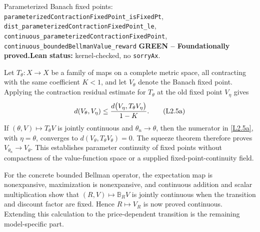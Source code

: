 \documentclass[11pt]{article}
\newcommand{\leanname}[1]{\nolinkurl{#1}}
\newcommand{\eqL}[1]{\refstepcounter{equation}\tag{L#1}}
\newcommand{\formalcheck}{\textbf{Lean status:} kernel-checked, no \texttt{sorryAx}.}
\newcommand{\greenstatus}{\textcolor{proved}{\textbf{GREEN -- Foundationally proved.}}}
\begin{document}
\begin{greenbox}{Parameterized Banach fixed points:
\leanname{parameterizedContractionFixedPoint_isFixedPt},
\leanname{dist_parameterizedContractionFixedPoint_le},
\leanname{continuous_parameterizedContractionFixedPoint},
\leanname{continuous_boundedBellmanValue_reward}}
\greenstatus\quad\formalcheck

Let $T_\theta:X\to X$ be a family of maps on a complete metric space, all
contracting with the same coefficient $K<1$, and let $V_\theta$ denote the
Banach fixed point.  Applying the contraction residual estimate for
$T_\theta$ at the old fixed point $V_\eta$ gives
\begin{equation}
 d(V_\theta,V_\eta)
 \le \frac{d\bigl(V_\eta,T_\theta V_\eta\bigr)}{1-K}.
 \eqL{2.5a}\label{L2.5a}
\end{equation}
If $(\theta,V)\mapsto T_\theta V$ is jointly continuous and
$\theta_n\to\theta$, then the numerator in \eqref{L2.5a}, with
$\eta=\theta$, converges to
$d(V_\theta,T_\theta V_\theta)=0$.  The squeeze theorem therefore proves
$V_{\theta_n}\to V_\theta$.  This establishes parameter continuity of
fixed points without compactness of the value-function space or a supplied
fixed-point-continuity field.

For the concrete bounded Bellman operator, the expectation map is
nonexpansive, maximization is nonexpansive, and continuous addition and scalar
multiplication show that $(R,V)\mapsto\mathbb B_RV$ is jointly continuous
when the transition and discount factor are fixed.  Hence
$R\mapsto V_R$ is now proved continuous.  Extending this calculation to the
price-dependent transition is the remaining model-specific part.
\end{greenbox}
\end{document}
